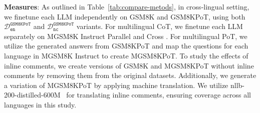 \vspace{2mm}
\noindent \textbf{Measures}: As outlined in Table~\ref{tab:compare-metods}, in cross-lingual setting, we finetune each LLM independently on GSM8K \cite{cobbe2021gsm8k} and GSM8KPoT, using both \(\mathcal{D}^\texttt{GSM8KPoT}_\texttt{en}\) and \(\mathcal{D}^\texttt{GSM8KPoT}_\texttt{nc}\) variants.
%
For multilingual CoT, we finetune each LLM separately on MGSM8K Instruct Parallel and Cross \cite{mathoctopus}.
%
For multilingual PoT, we utilize the generated answers from GSM8KPoT and map the questions for each language in MGSM8K Instruct to create MGSM8KPoT.
%
To study the effects of inline comments, we create versions of GSM8K and MGSM8KPoT without inline comments by removing them from the original datasets.
%
Additionally, we generate a variation of MGSM8KPoT by applying machine translation.
%
We utilize nllb-200-distilled-600M~\cite{nllb} for translating inline comments, ensuring coverage across all languages in this study.









